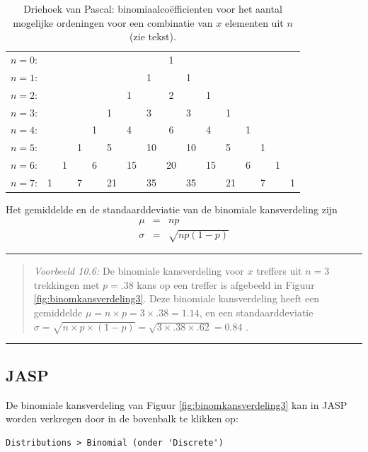 \documentclass[
]{book}
\begin{document}
\begin{longtable}[]{@{}llllllllclllllll@{}}
\caption{\label{tab:driehoekpascal} Driehoek van Pascal: binomiaalcoëfficienten voor het aantal mogelijke ordeningen voor een combinatie van \(x\) elementen uit \(n\) (zie tekst).}\tabularnewline
\toprule
\endhead
\(n= 0\): & & & & & & & & 1 & & & & & & &\tabularnewline
\(n= 1\): & & & & & & & 1 & & 1 & & & & & &\tabularnewline
\(n= 2\): & & & & & & 1 & & 2 & & 1 & & & & &\tabularnewline
\(n= 3\): & & & & & 1 & & 3 & & 3 & & 1 & & & &\tabularnewline
\(n= 4\): & & & & 1 & & 4 & & 6 & & 4 & & 1 & & &\tabularnewline
\(n= 5\): & & & 1 & & 5 & & 10 & & 10 & & 5 & & 1 & &\tabularnewline
\(n= 6\): & & 1 & & 6 & & 15 & & 20 & & 15 & & 6 & & 1 &\tabularnewline
\(n= 7\): & 1 & & 7 & & 21 & & 35 & & 35 & & 21 & & 7 & & 1\tabularnewline
\bottomrule
\end{longtable}

Het gemiddelde en de standaarddeviatie van de binomiale kansverdeling
zijn \[\begin{aligned}
    \mu & = & np \\
    \sigma & = & \sqrt{ np(1-p) }\end{aligned}\]

\begin{center}\rule{0.5\linewidth}{0.5pt}\end{center}

\begin{quote}
\emph{Voorbeeld 10.6:}
De binomiale kansverdeling voor \(x\) treffers uit \(n=3\) trekkingen met
\(p=.38\) kans op een treffer is afgebeeld in
Figuur \ref{fig:binomkansverdeling3}. Deze binomiale kansverdeling heeft
een gemiddelde \(\mu=n \times p = 3 \times .38 = 1.14\), en een
standaarddeviatie
\(\sigma = \sqrt{n \times p \times (1-p)} = \sqrt{ 3 \times .38 \times .62} = 0.84\)
.
\end{quote}

\begin{center}\rule{0.5\linewidth}{0.5pt}\end{center}

\hypertarget{jasp-4}{%
\subsection{JASP}\label{jasp-4}}

De binomiale kansverdeling van Figuur \ref{fig:binomkansverdeling3} kan in JASP worden verkregen door in de bovenbalk te klikken op:

\begin{verbatim}
Distributions > Binomial (onder 'Discrete')
\end{verbatim}
\end{document}
